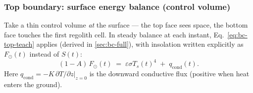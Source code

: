 \subsubsection{Top boundary: surface energy balance (control volume)}

Take a thin control volume \emph{at} the surface --- the top face sees space, the
bottom face touches the first regolith cell. In steady balance at each instant,
Eq.~\eqref{eq:bc-top-teach} applies (derived in \autoref{sec:bc-full}), with
insolation written explicitly as $F_\odot(t)$ instead of $S(t)$:
\[
  (1-A)\,F_\odot(t) \;=\; \varepsilon\sigma T_s(t)^4 \;+\; q_{\mathrm{cond}}(t).
\]
Here $q_{\mathrm{cond}} = -K\,\partial T/\partial z\big|_{z=0}$ is the downward
conductive flux (positive when heat enters the ground).

